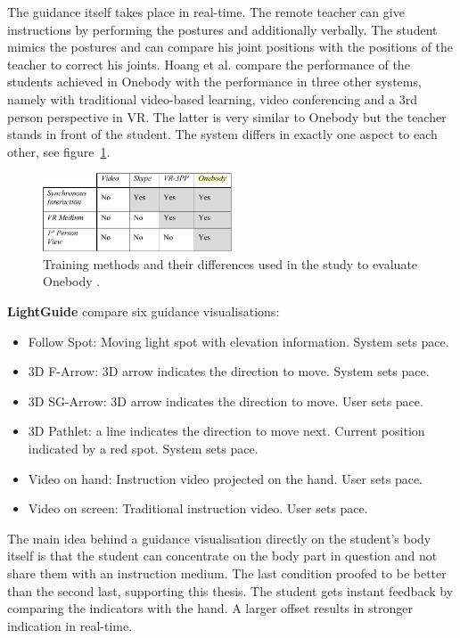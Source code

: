 The guidance itself takes place in real-time. The remote teacher can give instructions by performing the postures and additionally verbally. The student mimics the postures and can compare his joint positions with the positions of the teacher to correct his joints. Hoang et al. compare the performance of the students achieved in Onebody with the performance in three other systems, namely with traditional video-based learning, video conferencing and a 3rd person perspective in VR. The latter is very similar to Onebody but the teacher stands in front of the student. The system differs in exactly one aspect to each other, see figure~\ref{fig:ob2}.
\begin{figure}
	\centering
	\includegraphics[width=0.5\textwidth]{img/onebody_training_methods.PNG}
	\caption{Training methods and their differences used in the study to evaluate Onebody \cite{Hoang2016}.}
	\label{fig:ob2}
\end{figure}
\textbf{LightGuide} \cite{Sodhi2012} compare six guidance visualisations:
\begin{itemize}
	\item Follow Spot: Moving light spot with elevation information. System sets pace.
	\item 3D F-Arrow: 3D arrow indicates the direction to move. System sets pace.
	\item 3D SG-Arrow: 3D arrow indicates the direction to move. User sets pace.
	\item 3D Pathlet: a line indicates the direction to move next. Current position indicated by a red spot. System sets pace.
	\item Video on hand: Instruction video projected on the hand. User sets pace.
	\item Video on screen: Traditional instruction video. User sets pace.
\end{itemize}
The main idea behind a guidance visualisation directly on the student's body itself is that the student can concentrate on the body part in question and not share them with an instruction medium. The last condition proofed to be better than the second last, supporting this thesis.
The student gets instant feedback by comparing the indicators with the hand. A larger offset results in stronger indication in real-time.\\ \\


